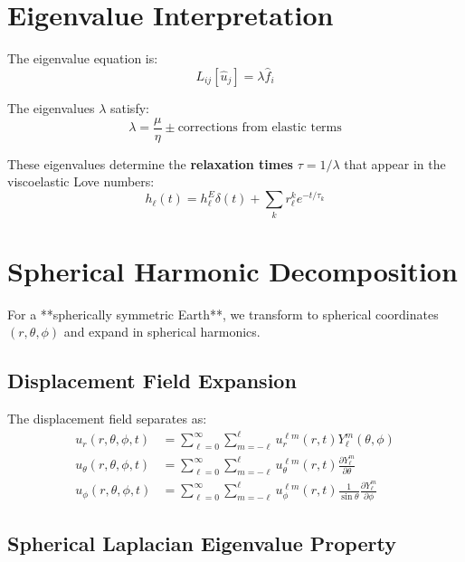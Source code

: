 \documentclass{article}
\begin{document}
\section{Eigenvalue Interpretation}

The eigenvalue equation is:
\begin{equation}
L_{ij}[\hat{u}_j] = \lambda\hat{f}_i
\end{equation}

The eigenvalues $\lambda$ satisfy:
\begin{equation}
\lambda = \frac{\mu}{\eta} \pm \text{corrections from elastic terms}
\end{equation}

These eigenvalues determine the \textbf{relaxation times} $\tau = 1/\lambda$ that appear in the viscoelastic Love numbers:
\begin{equation}
h_\ell(t) = h_\ell^E\delta(t) + \sum_k r_\ell^k e^{-t/\tau_k}
\end{equation}

\section{Spherical Harmonic Decomposition}

For a **spherically symmetric Earth**, we transform to spherical coordinates $(r,\theta,\phi)$ and expand in spherical harmonics.

\subsection{Displacement Field Expansion}

The displacement field separates as:
\begin{align}
u_r(r,\theta,\phi,t) &= \sum_{\ell=0}^{\infty} \sum_{m=-\ell}^{\ell} u_r^{\ell m}(r,t) Y_\ell^m(\theta,\phi) \\
u_\theta(r,\theta,\phi,t) &= \sum_{\ell=0}^{\infty} \sum_{m=-\ell}^{\ell} u_\theta^{\ell m}(r,t) \frac{\partial Y_\ell^m}{\partial \theta} \\
u_\phi(r,\theta,\phi,t) &= \sum_{\ell=0}^{\infty} \sum_{m=-\ell}^{\ell} u_\phi^{\ell m}(r,t) \frac{1}{\sin\theta}\frac{\partial Y_\ell^m}{\partial \phi}
\end{align}

\subsection{Spherical Laplacian Eigenvalue Property}
\end{document}
